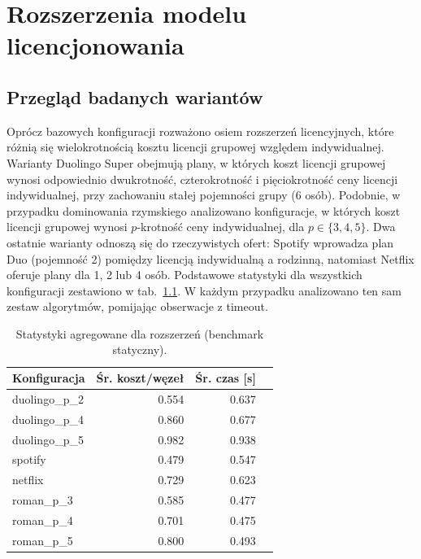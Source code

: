 \chapter{Rozszerzenia modelu licencjonowania}\label{chap:extensions}

\section{Przegląd badanych wariantów}
Oprócz bazowych konfiguracji rozważono osiem rozszerzeń licencyjnych, które różnią się wielokrotnością kosztu licencji grupowej względem indywidualnej. Warianty Duolingo Super obejmują plany, w których koszt licencji grupowej wynosi odpowiednio dwukrotność, czterokrotność i pięciokrotność ceny licencji indywidualnej, przy zachowaniu stałej pojemności grupy (6 osób). Podobnie, w przypadku dominowania rzymskiego analizowano konfiguracje, w których koszt licencji grupowej wynosi $p$-krotność ceny indywidualnej, dla $p \in \{3, 4, 5\}$. Dwa ostatnie warianty odnoszą się do rzeczywistych ofert: Spotify wprowadza plan Duo (pojemność 2) pomiędzy licencją indywidualną a rodzinną, natomiast Netflix oferuje plany dla 1, 2 lub 4 osób. Podstawowe statystyki dla wszystkich konfiguracji zestawiono w tab.~\ref{tab:ext-overall-static}. W każdym przypadku analizowano ten sam zestaw algorytmów, pomijając obserwacje z timeout.

\begin{table}[H]
  \centering
  \caption{Statystyki agregowane dla rozszerzeń (benchmark statyczny).}
  \label{tab:ext-overall-static}
  \begin{tabular}{lrrr}
    \toprule
    \textbf{Konfiguracja} & \textbf{Śr. koszt/węzeł} & \textbf{Śr. czas [s]} \\
    \midrule
    duolingo\_p\_2        & 0.554                    & 0.637                 \\
    duolingo\_p\_4        & 0.860                    & 0.677                 \\
    duolingo\_p\_5        & 0.982                    & 0.938                 \\
    spotify               & 0.479                    & 0.547                 \\
    netflix               & 0.729                    & 0.623                 \\
    roman\_p\_3           & 0.585                    & 0.477                 \\
    roman\_p\_4           & 0.701                    & 0.475                 \\
    roman\_p\_5           & 0.800                    & 0.493                 \\
  \end{tabular}
\end{table}

